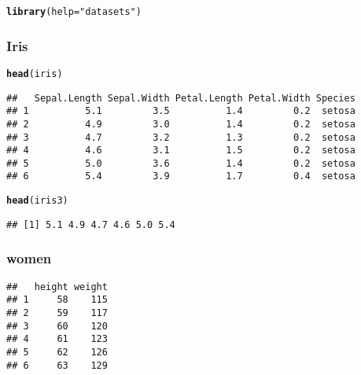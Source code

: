\documentclass[a4paper,10pt]{book}\usepackage[]{graphicx}\usepackage[]{color}
\makeatletter
\newcommand{\hlstr}[1]{\textcolor[rgb]{0.192,0.494,0.8}{#1}}%
\newcommand{\hlstd}[1]{\textcolor[rgb]{0.345,0.345,0.345}{#1}}%
\newcommand{\hlkwc}[1]{\textcolor[rgb]{0.333,0.667,0.333}{#1}}%
\newcommand{\hlkwd}[1]{\textcolor[rgb]{0.737,0.353,0.396}{\textbf{#1}}}%
\newenvironment{kframe}{%
 \def\at@end@of@kframe{}%
 \ifinner\ifhmode%
  \def\at@end@of@kframe{\end{minipage}}%
  \begin{minipage}{\columnwidth}%
 \fi\fi%
 \def\FrameCommand##1{\hskip\@totalleftmargin \hskip-\fboxsep
 \colorbox{shadecolor}{##1}\hskip-\fboxsep
     \hskip-\linewidth \hskip-\@totalleftmargin \hskip\columnwidth}%
 \MakeFramed {\advance\hsize-\width
   \@totalleftmargin\z@ \linewidth\hsize
   \@setminipage}}%
 {\par\unskip\endMakeFramed%
 \at@end@of@kframe}
\newenvironment{knitrout}{}{} %
\makeatother
\begin{document}
\begin{knitrout}
\color{fgcolor}\begin{kframe}
\begin{alltt}
\hlkwd{library}\hlstd{(}\hlkwc{help} \hlstd{=} \hlstr{"datasets"}\hlstd{)}
\end{alltt}
\end{kframe}
\end{knitrout}

\subsubsection{Iris}

\begin{knitrout}
\color{fgcolor}\begin{kframe}
\begin{alltt}
\hlkwd{head}\hlstd{(iris)}
\end{alltt}
\begin{verbatim}
##   Sepal.Length Sepal.Width Petal.Length Petal.Width Species
## 1          5.1         3.5          1.4         0.2  setosa
## 2          4.9         3.0          1.4         0.2  setosa
## 3          4.7         3.2          1.3         0.2  setosa
## 4          4.6         3.1          1.5         0.2  setosa
## 5          5.0         3.6          1.4         0.2  setosa
## 6          5.4         3.9          1.7         0.4  setosa
\end{verbatim}
\begin{alltt}
\hlkwd{head}\hlstd{(iris3)}
\end{alltt}
\begin{verbatim}
## [1] 5.1 4.9 4.7 4.6 5.0 5.4
\end{verbatim}
\end{kframe}
\end{knitrout}

\subsubsection*{women}

\begin{knitrout}
\color{fgcolor}\begin{kframe}
\begin{verbatim}
##   height weight
## 1     58    115
## 2     59    117
## 3     60    120
## 4     61    123
## 5     62    126
## 6     63    129
\end{verbatim}
\end{kframe}
\end{knitrout}
\end{document}
